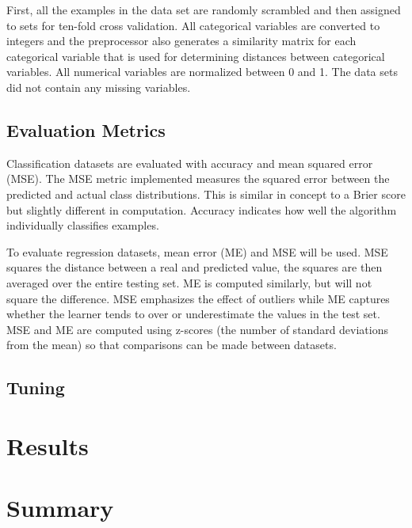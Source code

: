 \documentclass[twoside,10pt]{article}
\begin{document}
	First, all the examples in the data set are randomly scrambled and then assigned to sets for ten-fold cross validation. 
	All categorical variables are converted to integers 
	and the preprocessor also generates a similarity matrix for each categorical variable that is used for
	determining distances between categorical variables. 
	All numerical variables are normalized
	between 0 and 1. The data sets did not contain any missing variables.

\subsection{Evaluation Metrics}

	Classification datasets are evaluated with accuracy and mean squared error (MSE). 
	The MSE metric implemented measures the squared error between the predicted and actual class distributions. 
	This is similar in concept to a Brier score but slightly different in computation. Accuracy indicates how well the algorithm individually classifies examples.
	
	To evaluate regression datasets, mean error (ME) and MSE will be used. MSE squares the distance between a real and predicted value, the squares are then averaged over the entire testing set. 
	ME is computed similarly, but will not square the difference. MSE emphasizes the effect of outliers while ME captures whether the learner tends to over or underestimate the values in the test set. 
	MSE and ME are computed using z-scores (the number of standard deviations from the mean) so that comparisons can be made between datasets.

\subsection{Tuning}

\section{Results}

\section{Summary}

\newpage


\end{document}
